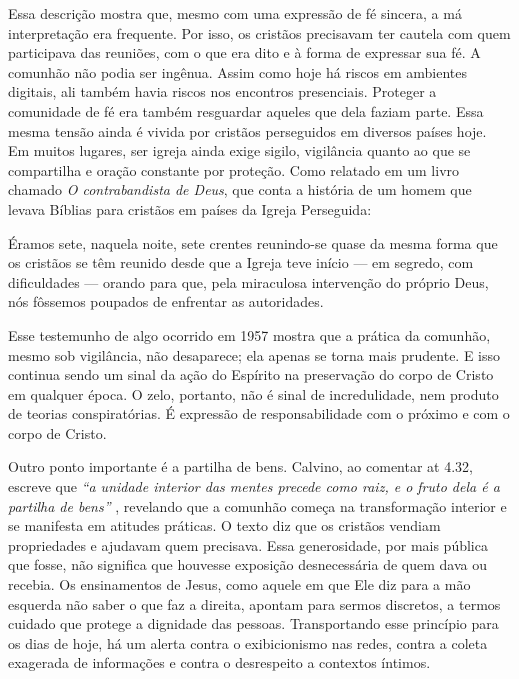 Essa descrição mostra que, mesmo com uma expressão de fé sincera, a má interpretação era frequente. Por isso, os cristãos precisavam ter cautela com quem participava das reuniões, com o que era dito e à forma de expressar sua fé. A comunhão não podia ser ingênua. Assim como hoje há riscos em ambientes digitais, ali também havia riscos nos encontros presenciais. Proteger a comunidade de fé era também resguardar aqueles que dela faziam parte. Essa mesma tensão ainda é vivida por cristãos perseguidos em diversos países hoje. Em muitos lugares, ser igreja ainda exige sigilo, vigilância quanto ao que se compartilha e oração constante por proteção. Como relatado em um livro chamado \textit{O contrabandista de Deus}, que conta a história de um homem que levava Bíblias para cristãos em países da Igreja Perseguida:

\begin{citacao}
    Éramos sete, naquela noite, sete crentes reunindo-se quase da mesma forma que os cristãos se têm reunido desde que a Igreja teve início — em segredo, com dificuldades — orando para que, pela miraculosa intervenção do próprio Deus, nós fôssemos poupados de enfrentar as autoridades. \cite[p.~166]{brotherAndrew}
\end{citacao}

Esse testemunho de algo ocorrido em 1957 mostra que a prática da comunhão, mesmo sob vigilância, não desaparece; ela apenas se torna mais prudente. E isso continua sendo um sinal da ação do Espírito na preservação do corpo de Cristo em qualquer época. O zelo, portanto, não é sinal de incredulidade, nem produto de teorias conspiratórias. É expressão de responsabilidade com o próximo e com o corpo de Cristo.

Outro ponto importante é a partilha de bens. Calvino, ao comentar \gls{at} 4.32, escreve que \textit{``a unidade interior das mentes precede como raiz, e o fruto dela é a partilha de bens''} \cite{calvinoAtos4}, revelando que a comunhão começa na transformação interior e se manifesta em atitudes práticas. O texto diz que os cristãos vendiam propriedades e ajudavam quem precisava. Essa generosidade, por mais pública que fosse, não significa que houvesse exposição desnecessária de quem dava ou recebia. Os ensinamentos de Jesus, como aquele em que Ele diz para a mão esquerda não saber o que faz a direita, apontam para sermos discretos, a termos cuidado que protege a dignidade das pessoas. Transportando esse princípio para os dias de hoje, há um alerta contra o exibicionismo nas redes, contra a coleta exagerada de informações e contra o desrespeito a contextos íntimos.

